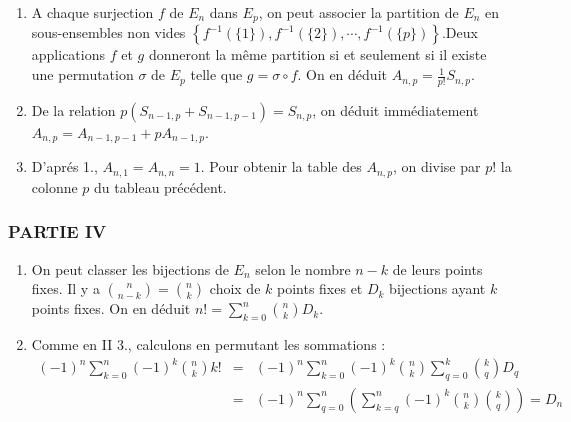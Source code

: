 \begin{enumerate}
\item  A chaque surjection $f$ de $E_{n}$ dans $E_{p}$, on peut associer la
partition de $E_{n}$ en sous-ensembles non vides $\left\{
f^{-1}(\{1\}),f^{-1}(\{2\}),\cdots ,f^{-1}(\{p\})\right\}
$.\newline Deux applications $f$ et $g$ donneront la m{\^e}me
partition si et seulement si il existe une permutation $\sigma $
de $E_{p}$ telle que $g=\sigma \circ f $. On en d{\'e}duit
$A_{n,p}=\frac{1}{p!}S_{n,p}$.

\item  De la relation $p(S_{n-1,p}+S_{n-1,p-1})=S_{n,p}$, on d{\'e}duit
imm{\'e}diatement $A_{n,p}=A_{n-1,p-1}+pA_{n-1,p}$.

\item  D'apr{\'e}s 1., $A_{n,1}=A_{n,n}=1$. Pour obtenir la table des $%
A_{n,p}$, on divise par $p!$ la colonne $p$ du tableau pr{\'e}c{\'e}dent.
\end{enumerate}

\subsubsection*{PARTIE IV}

\begin{enumerate}
\item  On peut classer les bijections de $E_{n}$ selon le nombre $n-k$ de
leurs points fixes. Il y a $\binom{n}{n-k}=\binom{n}{k}$ choix de
$k$ points
fixes et $D_{k}$ bijections ayant $k$ points fixes. On en d{\'e}duit $%
n!=\sum_{k=0}^{n}\binom{n}{k}D_{k}$.

\item  Comme en II 3., calculons en permutant les sommations :
\begin{eqnarray*}
(-1)^{n}\sum_{k=0}^{n}(-1)^{k}\binom{n}{k}k!
&=&(-1)^{n}\sum_{k=0}^{n}(-1)^{k}\binom{n}{k}\sum_{q=0}^{k}\binom{k}{q}
D_{q}\\
&=&(-1)^{n}\sum_{q=0}^{n}\left(
\sum_{k=q}^{n}(-1)^{k}\binom{n}{k}\binom{k}{q}\right)  =D_{n}
\end{eqnarray*}
\end{enumerate}
